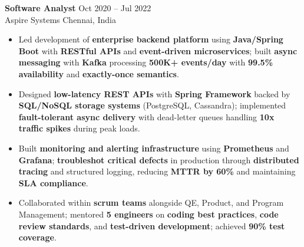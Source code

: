 \documentclass[letterpaper,10pt]{article}
\newcommand{\resumeItem}[1]{\item\small #1}
\newcommand{\resumeSubheading}[4]{
  \vspace{6pt}
  \noindent
  \textbf{#1} \hfill {\footnotesize #2} \\
  [-1pt]
  \noindent
  \small #3 \hfill {\small #4}
  \vspace{3pt}
}
\newcommand{\resumeItemsStart}{\vspace{-2pt}\begin{itemize}}
\newcommand{\resumeItemsEnd}{\end{itemize}\vspace{6pt}}
\begin{document}
\resumeSubheading
{Software Analyst}{Oct 2020 -- Jul 2022}
{Aspire Systems}{Chennai, India}
\resumeItemsStart
\resumeItem{Led development of \textbf{enterprise backend platform} using \textbf{Java/Spring Boot} with \textbf{RESTful APIs} and \textbf{event-driven microservices}; built \textbf{async messaging} with \textbf{Kafka} processing \textbf{500K+ events/day} with \textbf{99.5\% availability} and \textbf{exactly-once semantics}.}
\resumeItem{Designed \textbf{low-latency REST APIs} with \textbf{Spring Framework} backed by \textbf{SQL/NoSQL storage systems} (PostgreSQL, Cassandra); implemented \textbf{fault-tolerant async delivery} with dead-letter queues handling \textbf{10x traffic spikes} during peak loads.}
\resumeItem{Built \textbf{monitoring and alerting infrastructure} using \textbf{Prometheus} and \textbf{Grafana}; \textbf{troubleshot critical defects} in production through \textbf{distributed tracing} and structured logging, reducing \textbf{MTTR by 60\%} and maintaining \textbf{SLA compliance}.}
\resumeItem{Collaborated within \textbf{scrum teams} alongside QE, Product, and Program Management; mentored \textbf{5 engineers} on \textbf{coding best practices}, \textbf{code review standards}, and \textbf{test-driven development}; achieved \textbf{90\% test coverage}.}
\resumeItemsEnd
\vspace{-8pt}


\end{document}
